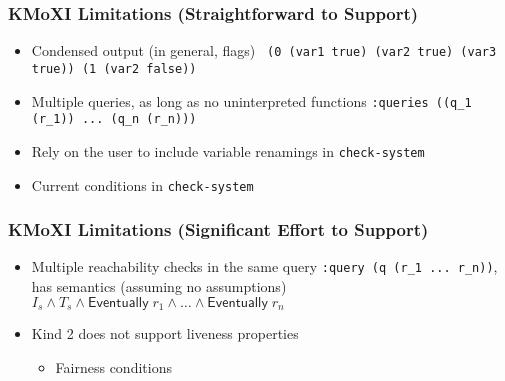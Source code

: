 \documentclass[11pt,xcolor={dvipsnames},hyperref={pdftex,pdfpagemode=UseNone,hidelinks,pdfdisplaydoctitle=true},usepdftitle=false]{beamer}
\newcommand{\code}[1]{{\footnotesize\texttt{#1}}}
\begin{document}
\begin{frame}
    \frametitle{KMoXI Limitations (Straightforward to Support)}
    \begin{itemize}
        \item Condensed output (in general, flags) \newline 
        {\footnotesize \texttt {
                (0 (var1 true) (var2 true) (var3 true)) \newline
                (1 (var2 false))}} \pause 
        \item Multiple queries, as long as no uninterpreted functions \newline 
        {\footnotesize \texttt {:queries ((q\_1 (r\_1)) ... (q\_n (r\_n)))}}
        \item Rely on the user to include variable renamings in \code{check-system}
        \item Current conditions in \code{check-system}
    \end{itemize}
\end{frame}

\begin{frame}
    \frametitle{KMoXI Limitations (Significant Effort to Support)}
    \begin{itemize}

        \pause
        \item Multiple reachability checks in the same query \newline \pause
        \code{:query (q (r\_1 ... r\_n))}, \newline has semantics (assuming no assumptions) \newline 
        $I_s \land T_s \land \mathsf{Eventually}\; r_1 \land \dots \land \mathsf{Eventually}\; r_n$ \pause
        \item Kind 2 does not support liveness properties \pause
        \begin{itemize}
        \item Fairness conditions \pause
        \end{itemize}
    \end{itemize}
\end{frame}
\end{document}
